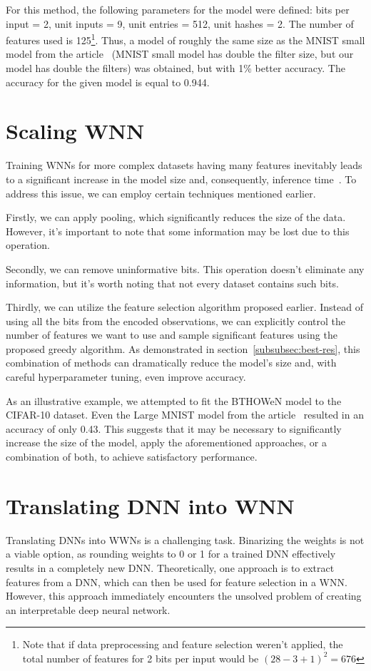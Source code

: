 \documentclass{article}[12pt]
\begin{document}
For this method, the following parameters for the model were defined: bits per input = 2, unit inputs = 9, unit entries = 512, unit hashes = 2.
The number of features used is 125\footnote{Note that if data preprocessing and feature selection weren't applied, the total number of features for 2 bits per input would be $(28-3+1)^2 = 676$}.
Thus, a model of roughly the same size as the MNIST small model from the article~\cite{susskind2022weightless} (MNIST small model has double the filter size, but our model has double the filters) was obtained, but with 1\% better accuracy.
The accuracy for the given model is equal to 0.944.


\section{Scaling WNN}\label{sec:scaling-wnn}
Training WNNs for more complex datasets having many features inevitably leads to a significant increase in the model size and, consequently, inference time~\cite{aleksander2009brief}.
To address this issue, we can employ certain techniques mentioned earlier.

Firstly, we can apply pooling, which significantly reduces the size of the data.
However, it's important to note that some information may be lost due to this operation.

Secondly, we can remove uninformative bits.
This operation doesn't eliminate any information, but it's worth noting that not every dataset contains such bits.

Thirdly, we can utilize the feature selection algorithm proposed earlier.
Instead of using all the bits from the encoded observations, we can explicitly control the number of features we want to use and sample significant features using the proposed greedy algorithm.
As demonstrated in section~\ref{subsubsec:best-res}, this combination of methods can dramatically reduce the model's size and, with careful hyperparameter tuning, even improve accuracy.

As an illustrative example, we attempted to fit the BTHOWeN model to the CIFAR-10 dataset.
Even the Large MNIST model from the article~\cite{susskind2022weightless} resulted in an accuracy of only 0.43.
This suggests that it may be necessary to significantly increase the size of the model, apply the aforementioned approaches, or a combination of both, to achieve satisfactory performance.

\section{Translating DNN into WNN}\label{sec:translating-dnn-into-wnn}
Translating DNNs into WWNs is a challenging task.
Binarizing the weights is not a viable option, as rounding weights to 0 or 1 for a trained DNN effectively results in a completely new DNN\@.
Theoretically, one approach is to extract features from a DNN, which can then be used for feature selection in a WNN\@.
However, this approach immediately encounters the unsolved problem of creating an interpretable deep neural network.
\end{document}
